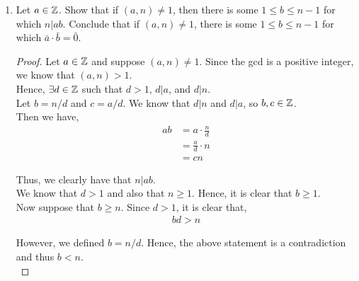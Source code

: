 \documentclass[11pt, reqno]{amsart}
\theoremstyle{plain}
\theoremstyle{definition}
\theoremstyle{example}
\begin{document}
\begin{enumerate}[1.]
\begin{enumerate}
\begin{proof}
The first three equalities come from the properties of modular multiplication described on p. 9 in the text.\\

Since multiplication in $(\ZZ/n\ZZ)^\times$ is well-defined and both $\overline{c_1}, \overline{c_2} \in (\ZZ/n\ZZ)^\times$, we have that $\overline{c_3} = \overline{c_1c_2} \in (\ZZ/n\ZZ)^\times$.\\

Similarly, $\overline{ab} \in (\ZZ/n\ZZ)^\times$\\

Hence by (1) and the above statements, we have that $\bar{a} \cdot \bar{b} = \overline{ab} \in (\ZZ/n\ZZ)^\times$.
\end{proof}

\item Let $a \in \mathbb{Z}$. Show that if $(a,n) \neq 1$, then there is some $1\leq b \leq n-1$ for which $n \big| ab$. Conclude that if $(a,n) \neq 1$, there is some $1\leq b \leq n-1$ for which  $\bar{a} \cdot \bar{b} = \bar{0}$. 


\begin{proof}
Let $a \in \mathbb{Z}$ and suppose $(a, n) \neq 1$. Since the gcd is a positive integer, we know that $(a, n) > 1$.\\

Hence, $\exists d \in \mathbb{Z}$ such that $d > 1$, $d | a$, and $d | n$.\\

Let $b = n/d$ and $c = a/d$. We know that $d|n$ and $d|a$, so $b, c \in \mathbb{Z}$.\\

Then we have,
\begin{align}
ab &= a \cdot \frac{n}{d} \nonumber \\
&= \frac{a}{d} \cdot n \nonumber \\
&= cn
\end{align}

Thus, we clearly have that $n | ab$.\\


We know that $d > 1$ and also that $n \geq 1$. Hence, it is clear that $b \geq 1$.\\

Now suppose that $b \geq n$. Since $d > 1$, it is clear that,
\begin{align*}
bd > n
\end{align*}

However, we defined $b = n/d$. Hence, the above statement is a contradiction and thus $b < n$.\\


\end{proof}
\end{enumerate}
\end{enumerate}
\end{document}

